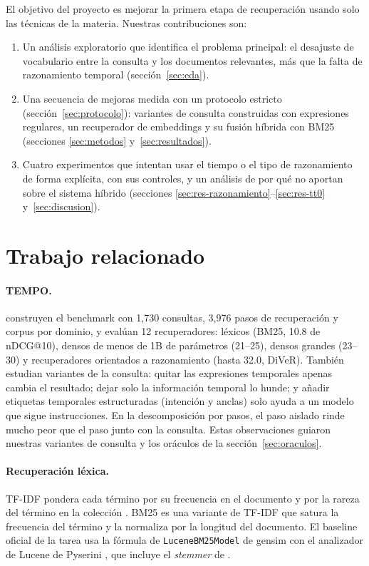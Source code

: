 \documentclass[11pt,a4paper]{article}
\begin{document}
El objetivo del proyecto es mejorar la primera etapa de recuperación usando solo las técnicas de la materia. Nuestras contribuciones son:
\begin{enumerate}
  \item Un análisis exploratorio que identifica el problema principal: el desajuste de vocabulario entre la consulta y los documentos relevantes, más que la falta de razonamiento temporal (sección~\ref{sec:eda}).
  \item Una secuencia de mejoras medida con un protocolo estricto (sección~\ref{sec:protocolo}): variantes de consulta construidas con expresiones regulares, un recuperador de embeddings y su fusión híbrida con BM25 (secciones \ref{sec:metodos} y~\ref{sec:resultados}).
  \item Cuatro experimentos que intentan usar el tiempo o el tipo de razonamiento de forma explícita, con sus controles, y un análisis de por qué no aportan sobre el sistema híbrido (secciones \ref{sec:res-razonamiento}--\ref{sec:res-tt0} y~\ref{sec:discusion}).
\end{enumerate}

\section{Trabajo relacionado}

\paragraph{TEMPO.} \citet{abdallah2026tempo} construyen el benchmark con 1,730 consultas, 3,976 pasos de recuperación y corpus por dominio, y evalúan 12 recuperadores: léxicos (BM25, 10.8 de nDCG@10), densos de menos de 1B de parámetros (21--25), densos grandes (23--30) y recuperadores orientados a razonamiento (hasta 32.0, DiVeR). También estudian variantes de la consulta: quitar las expresiones temporales apenas cambia el resultado; dejar solo la información temporal lo hunde; y añadir etiquetas temporales estructuradas (intención y anclas) solo ayuda a un modelo que sigue instrucciones. En la descomposición por pasos, el paso aislado rinde mucho peor que el paso junto con la consulta. Estas observaciones guiaron nuestras variantes de consulta y los oráculos de la sección~\ref{sec:oraculos}.

\paragraph{Recuperación léxica.} TF-IDF pondera cada término por su frecuencia en el documento y por la rareza del término en la colección \citep{sparckjones1972statistical,salton1988term}. BM25 \citep{robertson1994okapi,robertson2009probabilistic} es una variante de TF-IDF que satura la frecuencia del término y la normaliza por la longitud del documento. El baseline oficial de la tarea usa la fórmula de \texttt{LuceneBM25Model} de gensim \citep{rehurek2010gensim} con el analizador de Lucene de Pyserini \citep{lin2021pyserini}, que incluye el \emph{stemmer} de \citet{porter1980algorithm}.
\end{document}
